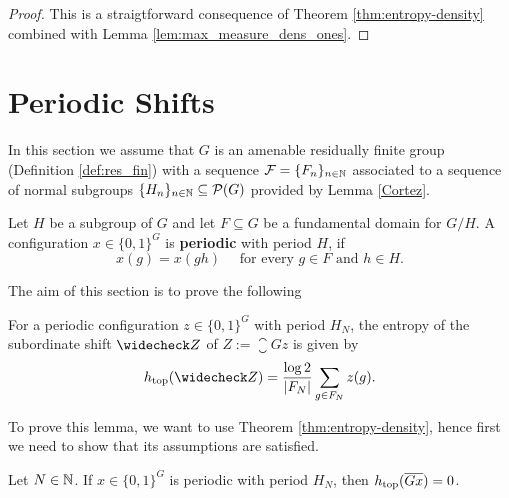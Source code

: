 \begin{proof}
This is a straigtforward consequence of Theorem \ref{thm:entropy-density} combined with Lemma \ref{lem:max_measure_dens_ones}.
\end{proof}


\section{Periodic Shifts}

In this section we assume that  $G$ is an amenable residually finite group (Definition \ref{def:res_fin}) with a \Folner sequence $\operatorname{\mathcal{F}}=\{F_n\}_{n\in\mathbb{N}}$ associated to a sequence of normal  subgroups $\{H_n\}_{n\in\mathbb{N}}\subseteq\operatorname{\mathcal{P}}(G)$ provided by Lemma \ref{Cortez}. 

\begin{defn}
Let $H$ be a subgroup of $G$ and let $F\subseteq G$ be a fundamental domain for $G/H$.
A configuration $x\in\{0,1\}^G$ is {\bf periodic} with period $H$, if  
\[
x(g) = x(gh)  \quad\text{ for every } g\in F\text{ and }h\in H.
\]
\end{defn}

\noindent
The aim of this section is to prove the following 

\begin{lem}\label{lem:subordinate_periodic_entropy}
For a periodic configuration $z\in\{0,1\}^G$ with period $H_N$, the entropy of the subordinate shift $\subord Z$ of  $Z:=\closure{Gz}$ is given by
\[ 
\htop(\subord{Z}) = \frac{\log 2}{|F_N|}\sum_{g\in F_N} z(g) .
\]
\end{lem}

\noindent
To prove this lemma, we want to use Theorem \ref{thm:entropy-density}, hence first we need to show that its assumptions are satisfied.

\begin{lem}\label{lem:periodicEntropy}
Let $N\in\mathbb{N}$. If $x\in\{0,1\}^G$  is periodic with period $H_N$, then $h_\mathrm{top}(\overline{Gx})=0$.
\end{lem}

